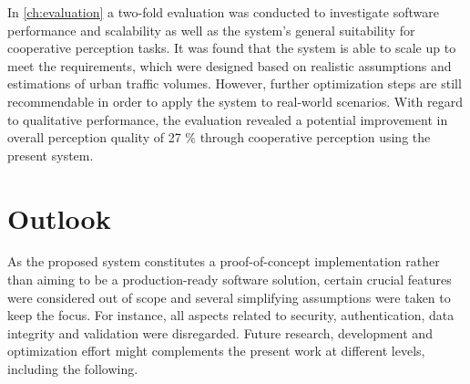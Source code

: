 In \cref{ch:evaluation} a two-fold evaluation was conducted to investigate software performance and scalability as well as the system's general suitability for cooperative perception tasks. It was found that the system is able to scale up to meet the requirements, which were designed based on realistic assumptions and estimations of urban traffic volumes. However, further optimization steps are still recommendable in order to apply the system to real-world scenarios. With regard to qualitative performance, the evaluation revealed a potential improvement in overall perception quality of 27 \% through cooperative perception using the present system. 

\section{Outlook}
\label{sec:conclusion:outlook}
As the proposed system constitutes a proof-of-concept implementation rather than aiming to be a production-ready software solution, certain crucial features were considered out of scope and several simplifying assumptions were taken to keep the focus. For instance, all aspects related to security, authentication, data integrity and validation were disregarded. Future research, development and optimization effort might complements the present work at different levels, including the following. 

